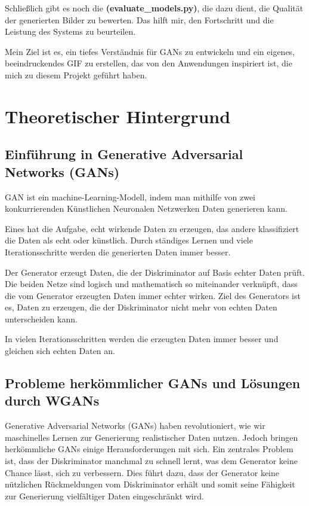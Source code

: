 \documentclass[a4paper, 12pt]{article}
\begin{document}
Schließlich gibt es noch die \textbf{(evaluate\_models.py)}, die dazu dient, die Qualität der generierten Bilder zu bewerten. Das hilft mir, den Fortschritt und die Leistung des Systems zu beurteilen.

Mein Ziel ist es, ein tiefes Verständnis für GANs zu entwickeln und ein eigenes, beeindruckendes GIF zu erstellen, das von den Anwendungen inspiriert ist, die mich zu diesem Projekt geführt haben.



\section{Theoretischer Hintergrund}
\subsection{Einführung in Generative Adversarial Networks (GANs)}
GAN ist ein machine-Learning-Modell, indem man mithilfe von zwei konkurrierenden Künstlichen Neuronalen Netzwerken Daten generieren kann. \cite{youtube_gans}

Eines hat die Aufgabe, echt wirkende Daten zu erzeugen, das andere klassifiziert die Daten als echt oder künstlich. Durch ständiges Lernen und viele Iterationsschritte werden die generierten Daten immer besser.\cite{youtube_gans}

Der Generator erzeugt Daten, die der Diskriminator auf Basis echter Daten prüft. Die beiden Netze sind logisch und mathematisch so miteinander verknüpft, dass die vom Generator erzeugten Daten immer echter wirken. Ziel des Generators ist es, Daten zu erzeugen, die der Diskriminator nicht mehr von echten Daten unterscheiden kann.\cite{youtube_gans}

In vielen Iterationsschritten werden die erzeugten Daten immer besser und gleichen sich echten Daten an.

\subsection{Probleme herkömmlicher GANs und Lösungen durch WGANs}
Generative Adversarial Networks (GANs) haben revolutioniert, wie wir maschinelles Lernen zur Generierung realistischer Daten nutzen. Jedoch bringen herkömmliche GANs einige Herausforderungen mit sich. Ein zentrales Problem ist, dass der Diskriminator manchmal zu schnell lernt, was dem Generator keine Chance lässt, sich zu verbessern. Dies führt dazu, dass der Generator keine nützlichen Rückmeldungen vom Diskriminator erhält und somit seine Fähigkeit zur Generierung vielfältiger Daten eingeschränkt wird\cite{mathworks_gan_training}.
\end{document}
